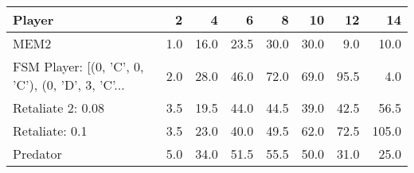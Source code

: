 \begin{tabular}{lrrrrrrr}
\toprule
                                            Player &    2 &     4 &     6 &     8 &    10 &    12 &     14 \\
\midrule
                                              MEM2 &  1.0 &  16.0 &  23.5 &  30.0 &  30.0 &   9.0 &   10.0 \\
 FSM Player: [(0, 'C', 0, 'C'), (0, 'D', 3, 'C'... &  2.0 &  28.0 &  46.0 &  72.0 &  69.0 &  95.5 &    4.0 \\
                                 Retaliate 2: 0.08 &  3.5 &  19.5 &  44.0 &  44.5 &  39.0 &  42.5 &   56.5 \\
                                    Retaliate: 0.1 &  3.5 &  23.0 &  40.0 &  49.5 &  62.0 &  72.5 &  105.0 \\
                                          Predator &  5.0 &  34.0 &  51.5 &  55.5 &  50.0 &  31.0 &   25.0 \\
\bottomrule
\end{tabular}
